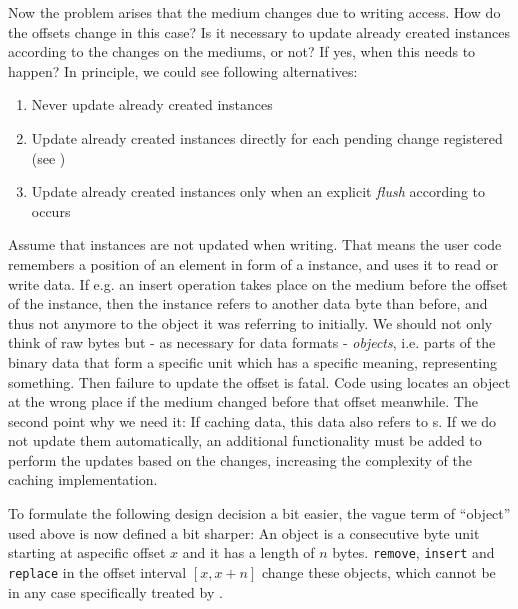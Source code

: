 Now the problem arises that the medium changes due to writing access. How do the offsets change in this case? Is it necessary to update already created \IMediumReference{} instances according to the changes on the mediums, or not? If yes, when this needs to happen? In principle, we could see following alternatives:
\begin{enumerate}
\item Never update already created \IMediumReference{} instances
\item Update already created \IMediumReference{} instances directly for each pending change registered (see )
\item Update already created \IMediumReference{} instances only when an explicit \emph{flush} according to  occurs
\end{enumerate}

Assume that \IMediumReference{} instances are not updated when writing. That means the user code remembers a position of an element in form of a \IMediumReference{} instance, and uses it to read or write data. If e.g. an insert operation takes place on the medium before the offset of the \IMediumReference{} instance, then the instance refers to another data byte than before, and thus not anymore to the object it was referring to initially. We should not only think of raw bytes but - as necessary for data formats - \emph{objects}, i.e. parts of the binary data that form a specific unit which has a specific meaning, representing something. Then failure to update the offset is fatal. Code using \COMPmedia{} locates an object at the wrong place if the medium changed before that offset meanwhile. The second point why we need it: If caching data, this data also refers to \IMediumReference{}s. If we do not update them automatically, an additional functionality must be added to perform the updates based on the changes, increasing the complexity of the caching implementation.

To formulate the following design decision a bit easier, the vague term of ``object'' used above is now defined a bit sharper: An object is a consecutive byte unit starting at aspecific offset $x$ and it has a length of $n$ bytes. \texttt{remove}, \texttt{insert} and \texttt{replace} in the offset interval $[x,x+n]$ change these objects, which cannot be in any case specifically treated by \COMPmedia{}.

